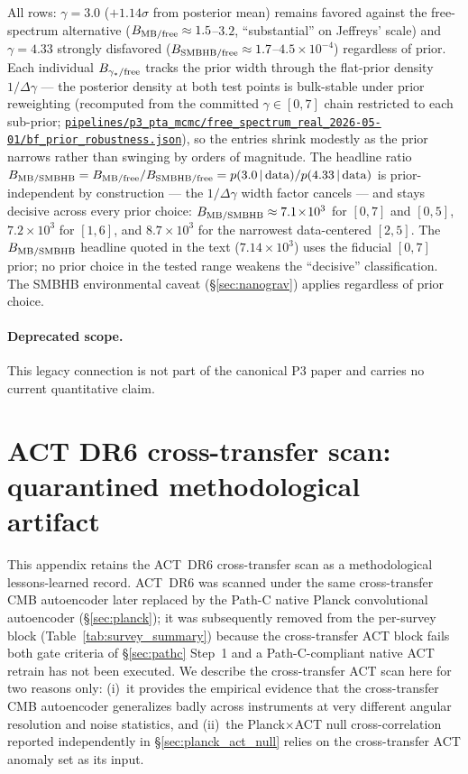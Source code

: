 \documentclass[aps,prd,twocolumn,superscriptaddress,showpacs,preprintnumbers,nofootinbib,longbibliography,floatfix]{revtex4-2}
\newcommand{\repoBase}{https://github.com/Hubify-Projects/bigbounce/blob/main}
\newcommand{\artifact}[1]{\href{\repoBase/#1}{\nolinkurl{#1}}}
\begin{document}
\begin{table}[tb]
{\footnotesize All rows: $\gamma=3.0$ ($+1.14\sigma$ from posterior mean) remains
favored against the free-spectrum alternative ($B_{\rm MB/free} \approx 1.5$--$3.2$, ``substantial''
on Jeffreys' scale) and $\gamma=4.33$ strongly disfavored ($B_{\rm SMBHB/free} \approx 1.7$--$4.5\!\times\!10^{-4}$)
regardless of prior. Each individual $B_{\gamma_*/{\rm free}}$ tracks the prior width through the
flat-prior density $1/\Delta\gamma$ --- the posterior density at both test points is bulk-stable under
prior reweighting (recomputed from the committed $\gamma\in[0,7]$ chain restricted to each sub-prior;
\artifact{pipelines/p3\_pta\_mcmc/free\_spectrum\_real\_2026-05-01/bf\_prior\_robustness.json}),
so the entries shrink modestly as the prior narrows rather than swinging by orders of magnitude.
The headline ratio $B_{\rm MB/SMBHB} = B_{\rm MB/free}/B_{\rm SMBHB/free} = p(3.0\,|\,{\rm data})/p(4.33\,|\,{\rm data})$
is prior-independent by construction --- the $1/\Delta\gamma$ width factor cancels --- and stays decisive
across every prior choice: $B_{\rm MB/SMBHB} \approx 7.1\!\times\!10^3$ for $[0,7]$ and $[0,5]$,
$7.2\!\times\!10^3$ for $[1,6]$, and $8.7\!\times\!10^3$ for the narrowest data-centered $[2,5]$.
The $B_{\rm MB/SMBHB}$ headline quoted in the text ($7.14\!\times\!10^3$) uses the fiducial $[0,7]$ prior;
no prior choice in the tested range weakens the ``decisive'' classification. The SMBHB environmental caveat (\S\ref{sec:nanograv}) applies regardless
of prior choice.}
\end{table}

\paragraph{Deprecated scope.} This legacy connection is not part of the canonical P3 paper and carries no current quantitative claim.

\section{ACT DR6 cross-transfer scan: quarantined methodological artifact}\label{sec:act_appendix}

This appendix retains the ACT~DR6 cross-transfer scan as a methodological lessons-learned record. ACT~DR6 was scanned under the same cross-transfer CMB autoencoder later replaced by the Path-C native Planck convolutional autoencoder (\S\ref{sec:planck}); it was subsequently removed from the per-survey block (Table~\ref{tab:survey_summary}) because the cross-transfer ACT block fails both gate criteria of \S\ref{sec:pathc} Step~1 and a Path-C-compliant native ACT retrain has not been executed. We describe the cross-transfer ACT scan here for two reasons only: (i)~it provides the empirical evidence that the cross-transfer CMB autoencoder generalizes badly across instruments at very different angular resolution and noise statistics, and (ii)~the Planck$\times$ACT null cross-correlation reported independently in \S\ref{sec:planck_act_null} relies on the cross-transfer ACT anomaly set as its input.
\end{document}
